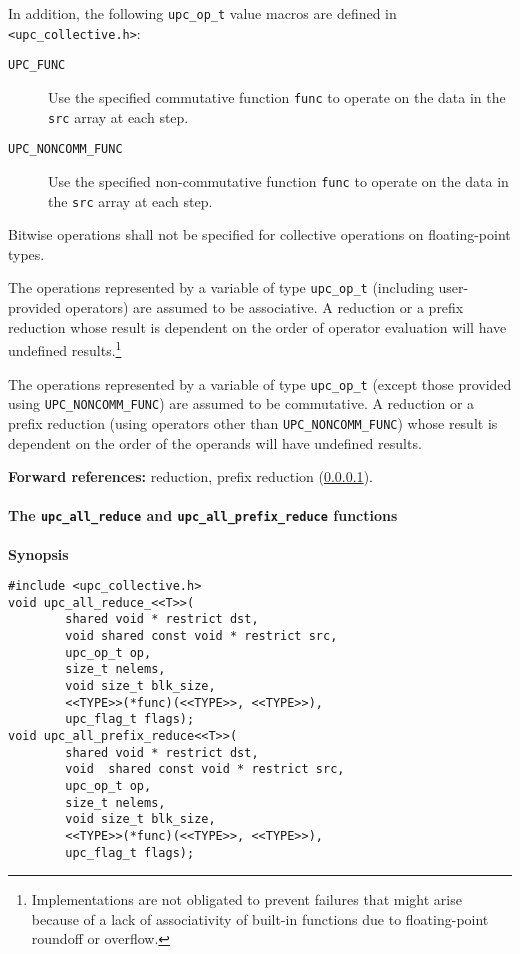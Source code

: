 In addition, the following {\tt upc\_op\_t} value macros 
are defined in {\tt <upc\_collective.h>}:
\begin{description}
\item[{\tt UPC\_FUNC}]
Use the specified commutative function {\tt func} to operate
on the data in the {\tt src} array at each step.
\item[{\tt UPC\_NONCOMM\_FUNC}]
Use the specified non-commutative function {\tt func} to
operate on the data in the {\tt src} array at each step.
\end{description}

\np Bitwise operations shall not be specified for collective 
    operations on floating-point types.

\np The operations represented by a variable of type {\tt upc\_op\_t}
(including user-provided operators) are assumed to be associative.
A reduction or a prefix reduction whose result is dependent on the
order of operator evaluation will have undefined results.\footnote{
Implementations are not obligated to prevent failures that
might arise because of a lack of associativity of built-in functions
due to floating-point roundoff or overflow.}

\np The operations represented by a variable of type {\tt upc\_op\_t}
(except those provided using {\tt UPC\_NONCOMM\_FUNC}) are assumed
to be commutative.  A reduction or a prefix reduction (using operators
other than {\tt UPC\_NONCOMM\_FUNC}) whose result is dependent on
the order of the operands will have undefined results.

{\bf Forward references:} reduction, prefix reduction (\ref{reduction}).

\paragraph{The {\tt upc\_all\_reduce} and {\tt upc\_all\_prefix\_reduce} functions}
\label{reduction}

{\bf Synopsis} 

\npf 
\begin{verbatim}
#include <upc_collective.h>
void upc_all_reduce_<<T>>(
        shared void * restrict dst,
        void shared const void * restrict src,
        upc_op_t op,
        size_t nelems,
        void size_t blk_size,
        <<TYPE>>(*func)(<<TYPE>>, <<TYPE>>),
        upc_flag_t flags);
void upc_all_prefix_reduce<<T>>(
        shared void * restrict dst,
        void  shared const void * restrict src,
        upc_op_t op,
        size_t nelems,
        void size_t blk_size,
        <<TYPE>>(*func)(<<TYPE>>, <<TYPE>>),
        upc_flag_t flags);
\end{verbatim}

